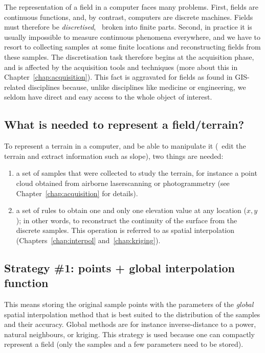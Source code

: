 %

The representation of a field in a computer faces many problems. 
First, fields are continuous functions, and, by contrast, computers are discrete machines. 
Fields must therefore be \emph{discretised}, \ie\ broken into finite parts.%
Second, in practice it is usually impossible to measure continuous phenomena everywhere, and we have to resort to collecting samples at some finite locations and reconstructing fields from these samples.
The discretisation task therefore begins at the acquisition phase, and is affected by the acquisition tools and techniques (more about this in Chapter~\ref{chap:acquisition}).
This fact is aggravated for fields as found in GIS-related disciplines because, unlike disciplines like medicine or engineering, we seldom have direct and easy access to the whole object of interest.


\subsection{What is needed to represent a field/terrain?}

To represent a terrain in a computer, and be able to manipulate it (\ie\ edit the terrain and extract information such as slope), two things are needed:
\begin{enumerate}
  \item a set of samples that were collected to study the terrain, for instance a point cloud obtained from airborne laserscanning or photogrammetry (see Chapter~\ref{chap:acquisition} for details).
  \item a set of rules to obtain one and only one elevation value at any location ($x,y$); in other words, to reconstruct the continuity of the surface from the discrete samples.
  This operation is referred to as spatial interpolation (Chapters~\ref{chap:interpol} and~\ref{chap:kriging}). 
\end{enumerate}


\subsection{Strategy \#1: points + global interpolation function}
This means storing the original sample points with the parameters of the \emph{global} spatial interpolation method that is best suited to the distribution of the samples and their accuracy.
Global methods are for instance inverse-distance to a power, natural neighbours, or kriging.
This strategy is used because one can compactly represent a field (only the samples and a few parameters need to be stored).

